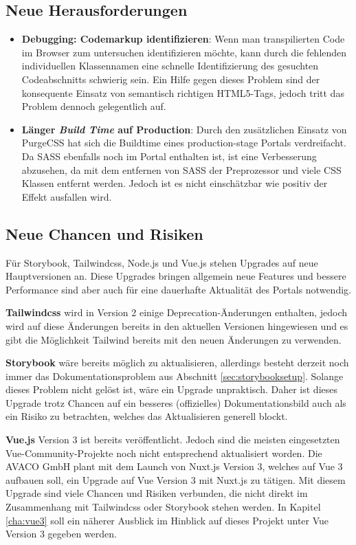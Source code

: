 \subsection{Neue Herausforderungen}
\label{sec:newChallenges}
\begin{itemize}
  \item \textbf{Debugging: Codemarkup identifizieren}: Wenn man transpilierten Code im Browser zum untersuchen identifizieren möchte, kann durch die fehlenden individuellen Klassennamen eine schnelle Identifizierung des gesuchten Codeabschnitts schwierig sein. Ein Hilfe gegen dieses Problem sind der konsequente Einsatz von semantisch richtigen HTML5-Tags, jedoch tritt das Problem dennoch gelegentlich auf.
  \item \textbf{Länger \emph{Build Time} auf Production}: Durch den zusätzlichen Einsatz von PurgeCSS hat sich die Buildtime eines production-stage Portals verdreifacht. Da SASS ebenfalls noch im Portal enthalten ist, ist eine Verbesserung abzusehen, da mit dem entfernen von SASS der Preprozessor und viele CSS Klassen entfernt werden. Jedoch ist es nicht einschätzbar wie positiv der Effekt ausfallen wird.
\end{itemize}

\subsection{Neue Chancen und Risiken}
Für Storybook, Tailwindcss, Node.js und Vue.js stehen Upgrades auf neue Hauptversionen an. Diese Upgrades bringen allgemein neue Features und bessere Performance sind aber auch für eine dauerhafte Aktualität des Portals notwendig. 

\textbf{Tailwindcss} wird in Version 2 einige Deprecation-Änderungen enthalten, jedoch wird auf diese Änderungen bereits in den aktuellen Versionen hingewiesen und es gibt die Möglichkeit Tailwind bereits mit den neuen Änderungen zu verwenden. 

\textbf{Storybook} wäre bereits möglich zu aktualisieren, allerdings besteht derzeit noch immer das Dokumentationsproblem aus Abschnitt \ref{sec:storybooksetup}. Solange dieses Problem nicht gelöst ist, wäre ein Upgrade unpraktisch. Daher ist dieses Upgrade trotz Chancen auf ein besseres (offizielles) Dokumentationsbild auch als ein Risiko zu betrachten, welches das Aktualisieren generell blockt.

\textbf{Vue.js} Version 3 ist bereits veröffentlicht. Jedoch sind die meisten eingesetzten Vue-Community-Projekte noch nicht entsprechend aktualisiert worden. Die AVACO GmbH plant mit dem Launch von Nuxt.js Version 3, welches auf Vue 3 aufbauen soll, ein Upgrade auf Vue Version 3 mit Nuxt.js zu tätigen.
Mit diesem Upgrade sind viele Chancen und Risiken verbunden, die nicht direkt im Zusammenhang mit Tailwindcss oder Storybook stehen werden. In Kapitel \ref{cha:vue3} soll ein näherer Ausblick im Hinblick auf dieses Projekt unter Vue Version 3 gegeben werden.

